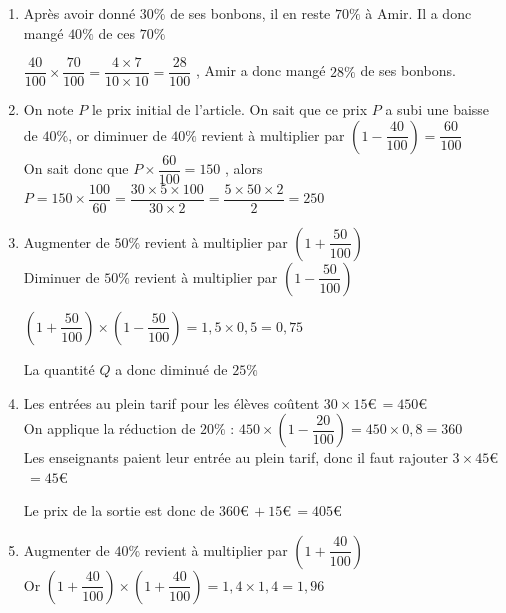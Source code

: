 \documentclass[oneside,12pt]{exam}          %
\begin{document}
\begin{enumerate}[itemsep = 2mm]
	\item
	Après avoir donné $30\%$ de ses bonbons, il en reste $70\%$ à Amir. Il a donc mangé $40\%$ de ces $70\%$
	
	$\dfrac{40}{100} \times \dfrac{70}{100} = \dfrac{4 \times 7}{10 \times 10} = \dfrac{28}{100}$ \quad , Amir a donc mangé $28\%$ de ses bonbons.
	
	\item On note $P$ le prix initial de l'article. On sait que ce prix $P$ a subi une baisse de $40\%$, or diminuer de $40\%$ revient à multiplier par $\left(1 - \dfrac{40}{100}\right) = \dfrac{60}{100}$ \\
	On sait donc que $P \times \dfrac{60}{100} = 150$ , alors $P = 150 \times \dfrac{100}{60} = \dfrac{30 \times 5 \times 100}{30 \times 2} = \dfrac{5 \times 50 \times 2}{2} = 250$ 
	
    \item
    Augmenter de $50\%$ revient à multiplier par $\left(1 + \dfrac{50}{100}\right)$ \\
    Diminuer de $50\%$ revient à multiplier par $\left(1 - \dfrac{50}{100}\right)$
    
    $\left(1 + \dfrac{50}{100}\right) \times \left(1 - \dfrac{50}{100}\right) = 1,5 \times 0,5 = 0,75$
    
    La quantité $Q$ a donc diminué de $25\%$
    
    \item
    Les entrées au plein tarif pour les élèves coûtent $30 \times 15$\euro $\,= 450$\euro \\    
    On applique la réduction de $20\%$ : $450 \times \left(1 - \dfrac{20}{100}\right) = 450 \times 0,8 = 360$ \\    
    Les enseignants paient leur entrée au plein tarif, donc il faut rajouter $3 \times 45$\euro $\,=45$\euro
    
    Le prix de la sortie est donc de $360$\euro $\,+15$\euro $\,=405$\euro
    
    \item
	Augmenter de $40\%$ revient à multiplier par $\left(1 + \dfrac{40}{100}\right)$ \\
	Or \quad $\left(1 + \dfrac{40}{100}\right) \times \left(1 + \dfrac{40}{100}\right) = 1,4 \times 1,4 = 1,96$
    
\end{enumerate}
\end{document}
